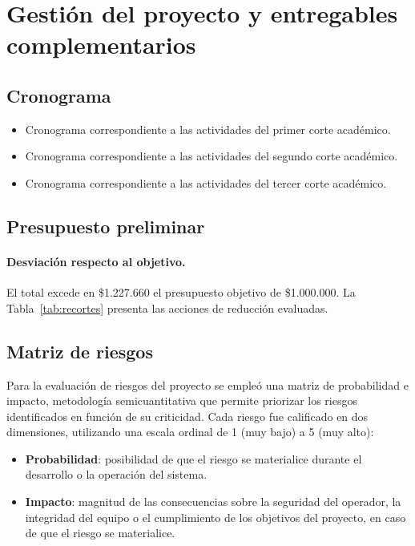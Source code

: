 \section{Gestión del proyecto y entregables complementarios}

\subsection{Cronograma}
\begin{itemize}
\item{Cronograma correspondiente a las actividades del primer corte académico.}

\item{Cronograma correspondiente a las actividades del segundo corte académico.}

\item{Cronograma correspondiente a las actividades del tercer corte académico.}

\end{itemize}

\subsection{Presupuesto preliminar}


\paragraph{Desviación respecto al objetivo.} El total excede en \$1.227.660 el presupuesto objetivo de \$1.000.000. La Tabla~\ref{tab:recortes} presenta las acciones de reducción evaluadas.



\subsection{Matriz de riesgos}
Para la evaluación de riesgos del proyecto se empleó una matriz de probabilidad e impacto, 
metodología semicuantitativa que permite priorizar los riesgos identificados en función de 
su criticidad. Cada riesgo fue calificado en dos dimensiones, utilizando una escala ordinal 
de 1 (muy bajo) a 5 (muy alto):

\begin{itemize}
    \item \textbf{Probabilidad}: posibilidad de que el riesgo se materialice durante el 
    desarrollo o la operación del sistema.
    \item \textbf{Impacto}: magnitud de las consecuencias sobre la seguridad del operador, 
    la integridad del equipo o el cumplimiento de los objetivos del proyecto, en caso de 
    que el riesgo se materialice.
\end{itemize}

